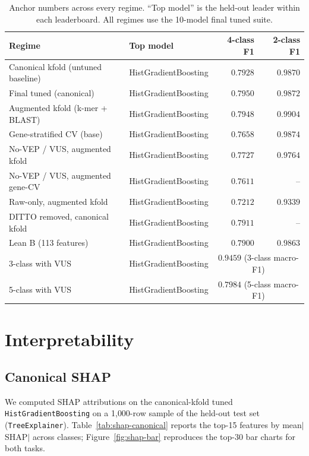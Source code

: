 \documentclass[11pt,a4paper]{article}
\begin{document}
\begin{table}[H]
\centering
\caption{Anchor numbers across every regime. ``Top model'' is the
held-out leader within each leaderboard. All regimes use the 10-model
final tuned suite.}
\label{tab:anchors}
\small
\begin{tabular}{llrr}
\toprule
Regime & Top model & 4-class F1 & 2-class F1 \\
\midrule
Canonical kfold (untuned baseline) & HistGradientBoosting & $0.7928$ & $0.9870$ \\
Final tuned (canonical) & HistGradientBoosting & $\mathbf{0.7950}$ & $\mathbf{0.9872}$ \\
Augmented kfold (k-mer + BLAST) & HistGradientBoosting & $0.7948$ & $0.9904$ \\
Gene-stratified CV (base) & HistGradientBoosting & $0.7658$ & $0.9874$ \\
No-VEP / VUS, augmented kfold & HistGradientBoosting & $0.7727$ & $0.9764$ \\
No-VEP / VUS, augmented gene-CV & HistGradientBoosting & $0.7611$ & -- \\
Raw-only, augmented kfold & HistGradientBoosting & $0.7212$ & $0.9339$ \\
DITTO removed, canonical kfold & HistGradientBoosting & $0.7911$ & -- \\
Lean B (113 features) & HistGradientBoosting & $0.7900$ & $0.9863$ \\
3-class with VUS & HistGradientBoosting & \multicolumn{2}{c}{$0.9459$ (3-class macro-F1)} \\
5-class with VUS & HistGradientBoosting & \multicolumn{2}{c}{$0.7984$ (5-class macro-F1)} \\
\bottomrule
\end{tabular}
\end{table}

\section{Interpretability}

\subsection{Canonical SHAP}

We computed SHAP attributions on the canonical-kfold tuned
\texttt{HistGradientBoosting} on a 1{,}000-row sample of the held-out
test set (\texttt{TreeExplainer}).
Table~\ref{tab:shap-canonical} reports the top-15 features by
mean$|$SHAP$|$ across classes; Figure~\ref{fig:shap-bar} reproduces the
top-30 bar charts for both tasks.
\end{document}
